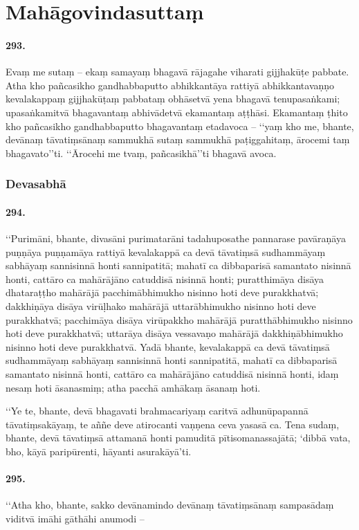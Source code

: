 \section{Mahāgovindasuttaṃ}

\paragraph{293.} Evaṃ me sutaṃ – ekaṃ samayaṃ bhagavā rājagahe viharati gijjhakūṭe pabbate. Atha kho pañcasikho gandhabbaputto abhikkantāya rattiyā abhikkantavaṇṇo kevalakappaṃ gijjhakūṭaṃ pabbataṃ obhāsetvā yena bhagavā tenupasaṅkami; upasaṅkamitvā bhagavantaṃ abhivādetvā ekamantaṃ aṭṭhāsi. Ekamantaṃ ṭhito kho pañcasikho gandhabbaputto bhagavantaṃ etadavoca – ‘‘yaṃ kho me, bhante, devānaṃ tāvatiṃsānaṃ sammukhā sutaṃ sammukhā paṭiggahitaṃ, ārocemi taṃ bhagavato’’ti. ‘‘Ārocehi me tvaṃ, pañcasikhā’’ti bhagavā avoca.

\subsubsection{Devasabhā}

\paragraph{294.} ‘‘Purimāni, bhante, divasāni purimatarāni tadahuposathe pannarase pavāraṇāya puṇṇāya puṇṇamāya rattiyā kevalakappā ca devā tāvatiṃsā sudhammāyaṃ sabhāyaṃ sannisinnā honti sannipatitā; mahatī ca dibbaparisā samantato nisinnā honti, cattāro ca mahārājāno catuddisā nisinnā honti; puratthimāya disāya dhataraṭṭho mahārājā pacchimābhimukho nisinno hoti deve purakkhatvā; dakkhiṇāya disāya virūḷhako mahārājā uttarābhimukho nisinno hoti deve purakkhatvā; pacchimāya disāya virūpakkho mahārājā puratthābhimukho nisinno hoti deve purakkhatvā; uttarāya disāya vessavaṇo mahārājā dakkhiṇābhimukho nisinno hoti deve purakkhatvā. Yadā bhante, kevalakappā ca devā tāvatiṃsā sudhammāyaṃ sabhāyaṃ sannisinnā honti sannipatitā, mahatī ca dibbaparisā samantato nisinnā honti, cattāro ca mahārājāno catuddisā nisinnā honti, idaṃ nesaṃ hoti āsanasmiṃ; atha pacchā amhākaṃ āsanaṃ hoti.

‘‘Ye te, bhante, devā bhagavati brahmacariyaṃ caritvā adhunūpapannā tāvatiṃsakāyaṃ, te aññe deve atirocanti vaṇṇena ceva yasasā ca. Tena sudaṃ, bhante, devā tāvatiṃsā attamanā honti pamuditā pītisomanassajātā; ‘dibbā vata, bho, kāyā paripūrenti, hāyanti asurakāyā’ti.

\paragraph{295.} ‘‘Atha kho, bhante, sakko devānamindo devānaṃ tāvatiṃsānaṃ sampasādaṃ viditvā imāhi gāthāhi anumodi –

